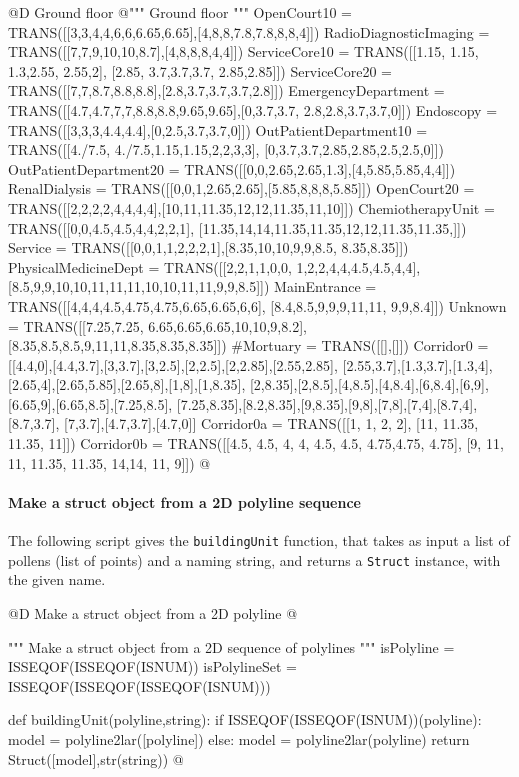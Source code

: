 \documentclass[11pt,oneside]{article}    %
\begin{document}
@D Ground floor 
@{""" Ground floor """
OpenCourt10 = TRANS([[3,3,4,4,6,6,6.65,6.65],[4,8,8,7.8,7.8,8,8,4]])
RadioDiagnosticImaging = TRANS([[7,7,9,10,10,8.7],[4,8,8,8,4,4]])
ServiceCore10 = TRANS([[1.15, 1.15, 1.3,2.55, 2.55,2], [2.85, 3.7,3.7,3.7, 
    2.85,2.85]])
ServiceCore20 = TRANS([[7,7,8.7,8.8,8.8],[2.8,3.7,3.7,3.7,2.8]])
EmergencyDepartment = TRANS([[4.7,4.7,7,7,8.8,8.8,9.65,9.65],[0,3.7,3.7,
    2.8,2.8,3.7,3.7,0]])
Endoscopy = TRANS([[3,3,3,4.4,4.4],[0,2.5,3.7,3.7,0]])
OutPatientDepartment10 = TRANS([[4./7.5, 4./7.5,1.15,1.15,2,2,3,3],
    [0,3.7,3.7,2.85,2.85,2.5,2.5,0]])
OutPatientDepartment20 = TRANS([[0,0,2.65,2.65,1.3],[4,5.85,5.85,4,4]])
RenalDialysis = TRANS([[0,0,1,2.65,2.65],[5.85,8,8,8,5.85]])
OpenCourt20 = TRANS([[2,2,2,2,4,4,4,4],[10,11,11.35,12,12,11.35,11,10]])
ChemiotherapyUnit = TRANS([[0,0,4.5,4.5,4,4,2,2,1],
    [11.35,14,14,11.35,11.35,12,12,11.35,11.35,]])
Service = TRANS([[0,0,1,1,2,2,2,1],[8.35,10,10,9,9,8.5, 8.35,8.35]])
PhysicalMedicineDept = TRANS([[2,2,1,1,0,0, 1,2,2,4,4,4.5,4.5,4,4],
    [8.5,9,9,10,10,11,11,11,10,10,11,11,9,9,8.5]])
MainEntrance = TRANS([[4,4,4,4.5,4.75,4.75,6.65,6.65,6,6],
    [8.4,8.5,9,9,9,11,11, 9,9,8.4]])
Unknown = TRANS([[7.25,7.25, 6.65,6.65,6.65,10,10,9,8.2],
    [8.35,8.5,8.5,9,11,11,8.35,8.35,8.35]])
#Mortuary = TRANS([[],[]])
Corridor0 = [[4.4,0],[4.4,3.7],[3,3.7],[3,2.5],[2,2.5],[2,2.85],[2.55,2.85],
    [2.55,3.7],[1.3,3.7],[1.3,4],[2.65,4],[2.65,5.85],[2.65,8],[1,8],[1,8.35],
    [2,8.35],[2,8.5],[4,8.5],[4,8.4],[6,8.4],[6,9],[6.65,9],[6.65,8.5],[7.25,8.5],
    [7.25,8.35],[8.2,8.35],[9,8.35],[9,8],[7,8],[7,4],[8.7,4],[8.7,3.7],
    [7,3.7],[4.7,3.7],[4.7,0]]
Corridor0a = TRANS([[1, 1, 2, 2], [11, 11.35, 11.35, 11]])
Corridor0b = TRANS([[4.5, 4.5, 4, 4, 4.5, 4.5, 4.75,4.75, 4.75],
    [9, 11, 11, 11.35, 11.35, 14,14, 11, 9]])
@}



\paragraph{Make a struct object from a 2D polyline sequence}

The following script gives the \texttt{buildingUnit} function, that takes as input a list of pollens (list of points)
and a naming string, and returns a \texttt{Struct} instance, with the given name.

@D Make a struct object from a 2D polyline 
@{""" Make a struct object from a 2D sequence of polylines  """
isPolyline = ISSEQOF(ISSEQOF(ISNUM))
isPolylineSet = ISSEQOF(ISSEQOF(ISSEQOF(ISNUM)))

def buildingUnit(polyline,string):
    if ISSEQOF(ISSEQOF(ISNUM))(polyline): model = polyline2lar([polyline])
    else: model = polyline2lar(polyline)
    return Struct([model],str(string))
@}
\end{document}
